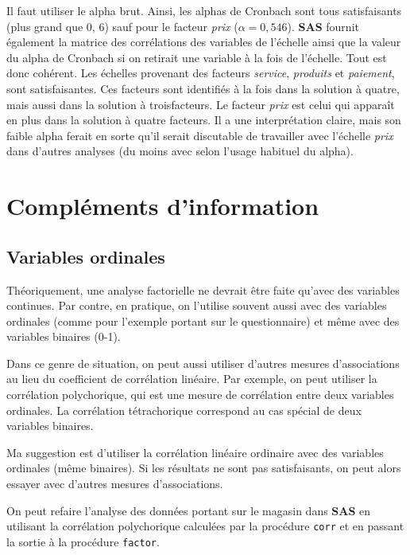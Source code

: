 \documentclass[
  11pt,
  letterpaper,
]{book}
\theoremstyle{definition}
\theoremstyle{definition}
\theoremstyle{definition}
\theoremstyle{remark}
\begin{document}
Il faut utiliser le alpha brut. Ainsi, les alphas de Cronbach sont tous
satisfaisants (plus grand que 0, 6) sauf pour le facteur \emph{prix} (\(\alpha=0, 546\)). \textbf{SAS} fournit également la matrice des corrélations des variables de l'échelle ainsi que la valeur du alpha de Cronbach si on retirait une variable à la fois de l'échelle. Tout est donc cohérent. Les échelles provenant des facteurs \emph{service}, \emph{produits} et \emph{paiement}, sont satisfaisantes. Ces facteurs sont identifiés à la fois dans la solution à quatre, mais aussi dans la solution à troisfacteurs. Le facteur \emph{prix} est celui qui apparaît en plus dans la solution à quatre facteurs. Il a une interprétation claire, mais son faible alpha ferait en sorte qu'il serait discutable de travailler avec l'échelle \emph{prix} dans d'autres analyses (du moins avec selon l'usage habituel du alpha).

\hypertarget{compluxe9ments-dinformation}{%
\section{Compléments d'information}\label{compluxe9ments-dinformation}}

\hypertarget{variables-ordinales}{%
\subsection{Variables ordinales}\label{variables-ordinales}}

Théoriquement, une analyse factorielle ne devrait être faite qu'avec des
variables continues. Par contre, en pratique, on l'utilise souvent aussi avec des variables ordinales (comme pour l'exemple portant sur le questionnaire) et même avec des variables binaires (0-1).

Dans ce genre de situation, on peut aussi utiliser d'autres mesures d'associations au lieu du coefficient de corrélation linéaire. Par exemple, on peut utiliser la corrélation polychorique, qui est une mesure de corrélation entre deux variables ordinales. La corrélation tétrachorique correspond au cas spécial de deux variables binaires.

Ma suggestion est d'utiliser la corrélation linéaire ordinaire avec des variables ordinales (même binaires). Si les résultats ne sont pas satisfaisants, on peut alors essayer avec d'autres mesures d'associations.

On peut refaire l'analyse des données portant sur le magasin dans \textbf{SAS} en utilisant la corrélation polychorique calculées par la procédure \texttt{corr} et en passant la sortie à la procédure \texttt{factor}.
\end{document}
